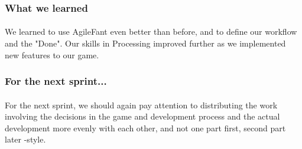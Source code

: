 \subsubsection{What we learned}

\paragraph{} We learned to use AgileFant even better than before, and to define our workflow and the "Done". Our skills in Processing improved further as we implemented new features to our game.

\subsubsection{For the next sprint...}

\paragraph{} For the next sprint, we should again pay attention to distributing the work involving the decisions in the game and development process and the actual development more evenly with each other, and not one part first, second part later -style.

